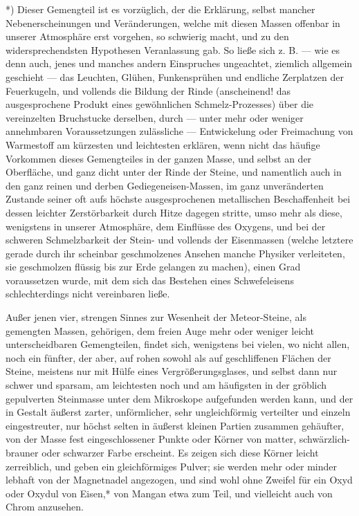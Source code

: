 \documentclass[a4paper, 11pt, oneside, german]{article}
\begin{document}
*) Dieser Gemengteil ist es vorzüglich, der die Erklärung, selbst mancher Nebenerscheinungen und Veränderungen, welche mit diesen Massen offenbar in unserer Atmosphäre erst vorgehen, so schwierig macht, und zu den widersprechendsten Hypothesen Veranlassung gab. So ließe sich z. B. --- wie es denn auch, jenes und manches andern Einspruches ungeachtet, ziemlich allgemein geschieht --- das Leuchten, Glühen, Funkensprühen und endliche Zerplatzen der Feuerkugeln, und vollends die Bildung der Rinde (anscheinend! das ausgesprochene Produkt eines gewöhnlichen Schmelz-Prozesses) über die vereinzelten Bruchstucke derselben, durch --- unter mehr oder weniger annehmbaren Voraussetzungen zulässliche --- Entwickelung oder Freimachung von Warmestoff am kürzesten und leichtesten erklären, wenn nicht das häufige Vorkommen dieses Gemengteiles in der ganzen Masse, und selbst an der Oberfläche, und ganz dicht unter der Rinde der Steine, und namentlich auch in den ganz reinen und derben Gediegeneisen-Massen, im ganz unveränderten Zustande seiner oft aufs höchste ausgesprochenen metallischen Beschaffenheit bei dessen leichter Zerstörbarkeit durch Hitze dagegen stritte, umso mehr als diese, wenigstens in unserer Atmosphäre, dem Einflüsse des Oxygens, und bei der schweren Schmelzbarkeit der Stein- und vollends der Eisenmassen (welche letztere gerade durch ihr scheinbar geschmolzenes Ansehen manche Physiker verleiteten, sie geschmolzen flüssig bis zur Erde gelangen zu machen), einen Grad voraussetzen wurde, mit dem sich das Bestehen eines Schwefeleisens schlechterdings nicht vereinbaren ließe.

Außer jenen vier, strengen Sinnes zur Wesenheit der Meteor-Steine, als gemengten Massen, gehörigen, dem freien Auge mehr oder weniger leicht unterscheidbaren Gemengteilen, findet sich, wenigstens bei vielen, wo nicht allen, noch ein fünfter, der aber, auf rohen sowohl als auf geschliffenen Flächen der Steine, meistens nur mit Hülfe eines Vergrößerungsglases, und selbst dann nur schwer und sparsam, am leichtesten noch und am häufigsten in der gröblich gepulverten Steinmasse unter dem Mikroskope aufgefunden werden kann, und der in Gestalt äußerst zarter, unförmlicher, sehr ungleichförmig verteilter und einzeln eingestreuter, nur höchst selten in äußerst kleinen Partien zusammen gehäufter, von der Masse fest eingeschlossener Punkte oder Körner von matter, schwärzlich-brauner oder schwarzer Farbe erscheint. Es zeigen sich diese Körner leicht zerreiblich, und geben ein gleichförmiges Pulver; sie werden mehr oder minder lebhaft von der Magnetnadel angezogen, und sind wohl ohne Zweifel für ein Oxyd oder Oxydul von Eisen,* von Mangan etwa zum Teil, und vielleicht auch von Chrom anzusehen.
\end{document}

